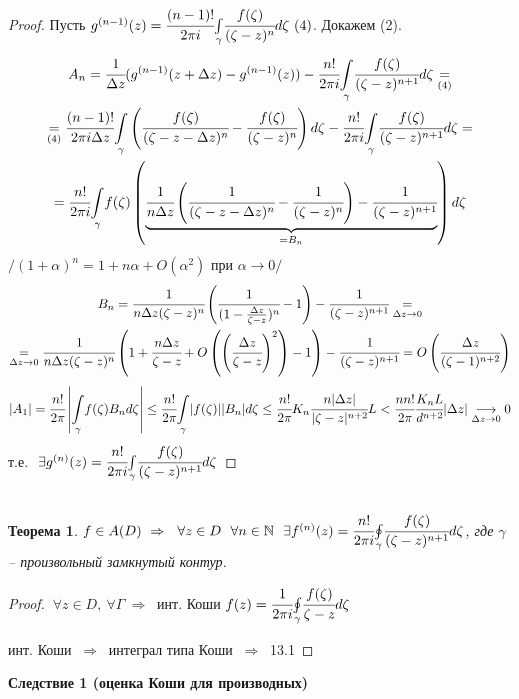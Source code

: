 \documentclass[final]{report}
\renewcommand{\bf}{\bfseries}
\newcommand{\then}{\ \Rightarrow\ }
\newcommand{\N}{\mathbb{N}}
\newcommand{\mint}[2]{\underset{#1}{\overset{#2}{\int}}}
\newcommand{\moint}[1]{\underset{#1}{\oint}}
\renewcommand{\a}{\alpha}
\newcommand{\g}{\gamma}
\newcommand{\G}{\Gamma}
\newcommand{\D}{\Delta}
\newcommand{\E}{\ \exists}
\newcommand{\F}{\ \forall}
\newcommand{\lra}[1]{\underset{#1}{\longrightarrow}}
\newtheorem*{theor}{Теорема}
\theoremstyle{remark}
\begin{document}
\begin{proof}
Пусть $g^{(n-1)}(z)=\cfrac{(n-1)!}{2\pi i}\mint{\g}{}\cfrac{f(\zeta)}{(\zeta-z)^n}d\zeta\ (4)$. Докажем (2).
\begin{multline*}
A_n=\cfrac1{\D z}(g^{(n-1)}(z+\D z)-g^{(n-1)}(z))-\cfrac{n!}{2\pi i}\mint{\g}{}\cfrac{f(\zeta)}{(\zeta-z)^{n+1}}d\zeta\underset{(4)}{=}\\
\underset{(4)}{=}\cfrac{(n-1)!}{2\pi i\D z}\mint{\g}{}\left(\cfrac{f(\zeta)}{(\zeta-z-\D z)^n}-\cfrac{f(\zeta)}{(\zeta-z)^n}\right)d\zeta-\cfrac{n!}{2\pi i}\mint{\g}{}\cfrac{f(\zeta)}{(\zeta-z)^{n+1}}d\zeta=\\
=\cfrac{n!}{2\pi i}\mint{\g}{}f(\zeta)\left(\underset{=B_n}{\underbrace{\cfrac1{n\D z}\left(\cfrac1{(\zeta-z-\D z)^n}-\cfrac1{(\zeta-z)^n}\right)-\cfrac1{(\zeta-z)^{n+1}}}}\right)d\zeta
\end{multline*}
$/(1+\a)^n=1+n\a+O(\a^2)$ при $\a\to0/$
\begin{multline*}
B_n=\cfrac1{n\D z(\zeta-z)^n}\left(\cfrac1{(1-\frac{\D z}{\zeta-z})^n}-1\right)-\cfrac1{(\zeta-z)^{n+1}}\underset{\D z\to 0}{=}\\
\underset{\D z\to 0}{=}\cfrac1{n\D z(\zeta-z)^n}\left(1+\cfrac{n\D z}{\zeta-z}+O\left(\left(\cfrac{\D z}{\zeta-z}\right)^2\right)-1\right)-\cfrac1{(\zeta-z)^{n+1}}=O\left(\cfrac{\D z}{(\zeta-1)^{n+2}}\right)
\end{multline*}
$$|A_1|=\cfrac{n!}{2\pi}\left|\mint{\g}{}f(\zeta)B_nd\zeta\right|\leq\cfrac{n!}{2\pi}\mint{\g}{}|f(\zeta)||B_n|d\zeta\leq\cfrac{n!}{2\pi}K_n\cfrac{n|\D z|}{|\zeta-z|^{n+2}}L<\cfrac{nn!}{2\pi}\cfrac{K_nL}{d^{n+2}}|\D z|\lra{\D z\to0}0$$
т.е. $\E g^{(n)}(z)=\cfrac{n!}{2\pi i}\mint{\g}{}\cfrac{f(\zeta)}{(\zeta-z)^{n+1}}d\zeta$
\end{proof}

\subsection{}

\begin{theor}
$f\in A(D)\then \F z\in D\ \F n\in\N\ \E f^{(n)}(z)=\cfrac{n!}{2\pi i}\moint{\g}\cfrac{f(\zeta)}{(\zeta-z)^{n+1}}d\zeta$, где $\g$ -- произвольный замкнутый контур.
\end{theor}
\begin{proof}
$\F z\in D,\F \G \then$ инт. Коши $f(z)=\cfrac{1}{2\pi i}\moint{\g}\cfrac{f(\zeta)}{\zeta-z}d\zeta$

инт. Коши $\then$ интеграл типа Коши $\then$ 13.1
\end{proof}
{\bf Следствие 1 (оценка Коши для производных)}
\end{document}
